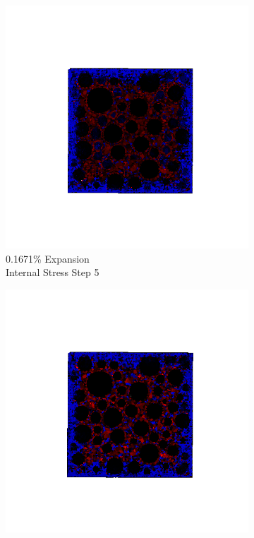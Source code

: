 \begin{figure}[ht!]
\centering
    \begin{subfigure}{.25\textwidth}
      \centering
      \includegraphics[width=1.0\linewidth]{Files/exp_3D/DEF/A30X-5C_1_s5.png}
      \caption{0.1671\% Expansion\\Internal Stress Step 5}
    \end{subfigure}%
    \begin{subfigure}{.25\textwidth}
      \centering
      \includegraphics[width=1.0\linewidth]{Files/exp_3D/DEF/A30X-5C_1_s10.png}

\end{subfigure}
\end{figure}
